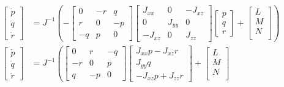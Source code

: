 \begin{equation*}
  \begin{split}
    \begin{bmatrix}
      \dot{p} \\
      \dot{q} \\
      \dot{r}
    \end{bmatrix}
    &=J^{-1}
    \left(
      -\begin{bmatrix}
        0 & -r & q \\
        r & 0 & -p \\
        -q & p & 0
      \end{bmatrix}
      \begin{bmatrix}
        J_{xx} & 0 & -J_{xz} \\
        0 & J_{yy} & 0 \\
        -J_{xz} & 0 & J_{zz}
      \end{bmatrix}
      \begin{bmatrix}
        p \\
        q \\
        r
      \end{bmatrix}+
      \begin{bmatrix}
        L \\
        M \\
        N \\
      \end{bmatrix}
    \right) \\
    \begin{bmatrix}
      \dot{p} \\
      \dot{q} \\
      \dot{r}
    \end{bmatrix}
    &=J^{-1}
    \left(
      \begin{bmatrix}
        0 & r & -q \\
        -r & 0 & p \\
         q & -p & 0
      \end{bmatrix}
      \begin{bmatrix}
        J_{xx}p-J_{xz}r \\
        J_{yy}q \\
        -J_{xz}p+J_{zz}r
      \end{bmatrix}+
      \begin{bmatrix}
        L \\
        M \\
        N \\
      \end{bmatrix}

\end{split}
\end{equation*}
